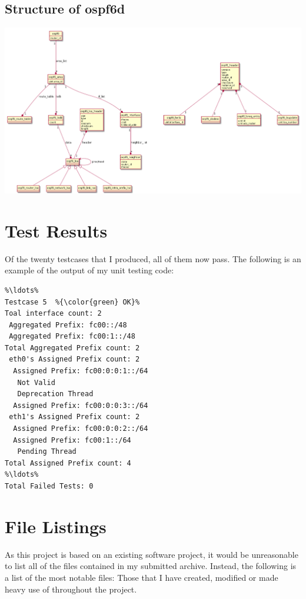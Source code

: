 \begin{landscape}
\chapter{Structure of ospf6d}
\label{ospf6d}
\begin{center}
  \includegraphics[width=0.9\linewidth]{../Diagrams/UML/quaggaOSPF6D/ospf6d_simple.png}
\end{center}

\end{landscape}

\chapter{Test Results}
\label{testResults}
Of the twenty testcases that I produced, all of them now pass. The following is an
example of the output of my unit testing code: 

\begin{lstlisting}
%\ldots%
Testcase 5  %{\color{green} OK}%
Toal interface count: 2 
 Aggregated Prefix: fc00::/48
 Aggregated Prefix: fc00:1::/48
Total Aggregated Prefix count: 2 
 eth0's Assigned Prefix count: 2
  Assigned Prefix: fc00:0:0:1::/64
   Not Valid
   Deprecation Thread
  Assigned Prefix: fc00:0:0:3::/64
 eth1's Assigned Prefix count: 2
  Assigned Prefix: fc00:0:0:2::/64
  Assigned Prefix: fc00:1::/64
   Pending Thread
Total Assigned Prefix count: 4 
%\ldots%
Total Failed Tests: 0
\end{lstlisting}

\chapter{File Listings}
As this project is based on an existing software project, it would be
unreasonable to list all of the files contained in my submitted archive.
Instead, the following is a list of the most notable files: Those that I have
created, modified or made heavy use of throughout the project.

